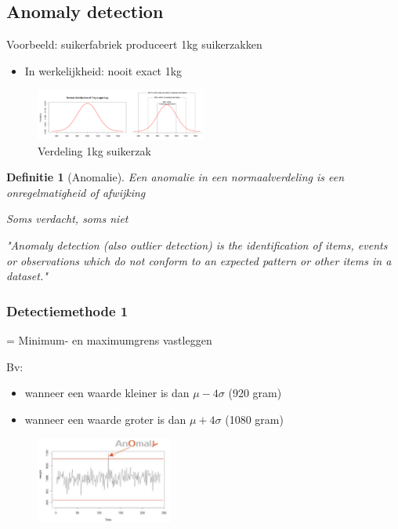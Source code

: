 \documentclass{article}
\newtheorem{theorem}{Definitie}[section]
\begin{document}
\subsection{Anomaly detection}

Voorbeeld: suikerfabriek produceert 1kg suikerzakken

\begin{itemize}
    \item In werkelijkheid: nooit exact 1kg
\end{itemize}

\begin{figure}[H]
    \centering
    \includegraphics[width=0.5\textwidth]{anomaly-detection.png}
    \caption{Verdeling 1kg suikerzak}
\end{figure}

\begin{theorem}[Anomalie]
    Een anomalie in een normaalverdeling is een onregelmatigheid of afwijking

    Soms verdacht, soms niet

    "Anomaly detection (also outlier detection) is the identification of items,
    events or observations which do not conform to an expected pattern or
    other items in a dataset."
\end{theorem}

\subsubsection{Detectiemethode 1}

= Minimum- en maximumgrens vastleggen

Bv:

\begin{itemize}
    \item wanneer een waarde kleiner is dan $\mu - 4\sigma$ (920 gram)
    \item wanneer een waarde groter is dan $\mu + 4\sigma$ (1080 gram)
\end{itemize}

\begin{figure}[H]
    \centering
    \includegraphics[width=0.4\textwidth]{anomaly-detection2.png}
    \caption{}
\end{figure}
\end{document}
